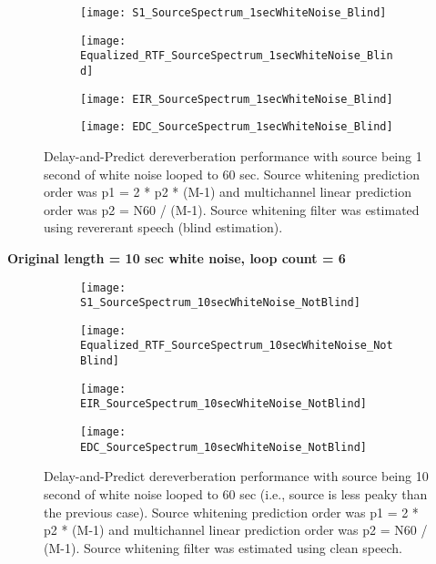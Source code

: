 \begin{figure}[H]
	\centering
	\begin{subfigure}[b]{0.49\textwidth}
		\centering
		\texttt{[image: S1\_SourceSpectrum\_1secWhiteNoise\_Blind]}
	\end{subfigure}
	\hfill
	\begin{subfigure}[b]{0.49\textwidth}
		\centering
		\texttt{[image: Equalized\_RTF\_SourceSpectrum\_1secWhiteNoise\_Blind]}
	\end{subfigure}
	\hfill
	\begin{subfigure}[b]{0.49\textwidth}
		\centering
		\texttt{[image: EIR\_SourceSpectrum\_1secWhiteNoise\_Blind]}
	\end{subfigure}
	\hfill
	\begin{subfigure}[b]{0.49\textwidth}
		\centering
		\texttt{[image: EDC\_SourceSpectrum\_1secWhiteNoise\_Blind]}
	\end{subfigure}
	\hfill
	\caption{Delay-and-Predict dereverberation performance with source being 1 second of white noise looped to 60 sec. Source whitening prediction order was p1 = 2 * p2 * (M-1) and multichannel linear prediction order was p2 = N60 / (M-1). Source whitening filter was estimated using revererant speech (blind estimation).}
	\label{fig:params_source_spectrum_1sec_blind}
\end{figure}


\textbf{Original length = 10 sec white noise, loop count = 6}

\begin{figure}[H]
	\centering
	\begin{subfigure}[b]{0.49\textwidth}
		\centering
		\texttt{[image: S1\_SourceSpectrum\_10secWhiteNoise\_NotBlind]}
	\end{subfigure}
	\hfill
	\begin{subfigure}[b]{0.49\textwidth}
		\centering
		\texttt{[image: Equalized\_RTF\_SourceSpectrum\_10secWhiteNoise\_NotBlind]}
	\end{subfigure}
	\hfill
	\begin{subfigure}[b]{0.49\textwidth}
		\centering
		\texttt{[image: EIR\_SourceSpectrum\_10secWhiteNoise\_NotBlind]}
	\end{subfigure}
	\hfill
	\begin{subfigure}[b]{0.49\textwidth}
		\centering
		\texttt{[image: EDC\_SourceSpectrum\_10secWhiteNoise\_NotBlind]}
	\end{subfigure}
	\hfill
	\caption{Delay-and-Predict dereverberation performance with source being 10 second of white noise looped to 60 sec (i.e., source is less peaky than the previous case). Source whitening prediction order was p1 = 2 * p2 * (M-1) and multichannel linear prediction order was p2 = N60 / (M-1). Source whitening filter was estimated using clean speech.}
	\label{fig:params_source_spectrum_10sec_not_blind}
\end{figure}

